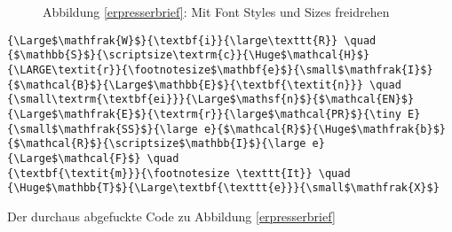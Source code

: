 \documentclass[a4paper]{scrartcl}
\begin{document}
\begin{figure}[h!]
    \centering

    \vspace{1em}
    Abbildung \ref{erpresserbrief}: Mit Font Styles und Sizes freidrehen
\end{figure}

\begin{listing}[h!]
    \begin{verbatim}
{\Large$\mathfrak{W}$}{\textbf{i}}{\large\texttt{R}} \quad
{$\mathbb{S}$}{\scriptsize\textrm{c}}{\Huge$\mathcal{H}$}{\LARGE\textit{r}}{\footnotesize$\mathbf{e}$}{\small$\mathfrak{I}$}{$\mathcal{B}$}{\Large$\mathbb{E}$}{\textbf{\textit{n}}} \quad
{\small\textrm{\textbf{ei}}}{\Large$\mathsf{n}$}{$\mathcal{EN}$}
{\Large$\mathfrak{E}$}{\textrm{r}}{\large$\mathcal{PR}$}{\tiny E}{\small$\mathfrak{SS}$}{\large e}{$\mathcal{R}$}{\Huge$\mathfrak{b}$}{$\mathcal{R}$}{\scriptsize$\mathbb{I}$}{\large e}{\Large$\mathcal{F}$} \quad
{\textbf{\textit{m}}}{\footnotesize \texttt{It}} \quad
{\Huge$\mathbb{T}$}{\Large\textbf{\texttt{e}}}{\small$\mathfrak{X}$}
    \end{verbatim}
    \caption{Der durchaus abgefuckte Code zu Abbildung \ref{erpresserbrief}}
\end{listing}
\end{document}
